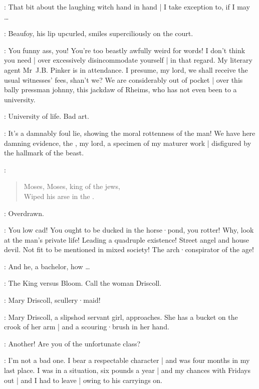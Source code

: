 \Bloom:
That bit about the laughing witch%
hand in hand |
I take exception to,
if I may \ldots

:
Beaufoy,
his lip upcurled,
smiles superciliously on the court.

\Beaufoy:
You funny ass,
you!
You're too beastly awfully weird for words!
I don't think you need |
over excessively disincommodate yourself |
in that regard.
My literary agent Mr~J.B. Pinker is in attendance.
I presume,
my lord,
we shall receive the usual witnesses' fees,
shan't we?
We are considerably out of pocket |
over this bally pressman johnny,
this jackdaw of Rheims,
who has not even been to a university.

\Bloom:
University of life.
Bad art.

\Beaufoy:
It's a damnably foul lie,
showing the moral rottenness of the man!
We have here damning evidence,
the ,
my lord,
a specimen of my maturer work |
disfigured by the hallmark of the beast.

\GalleryVoice:
\begin{verse}
    Moses, Moses, king of the jews,\\
    Wiped his arse in the .
\end{verse}

\Bloom:
Overdrawn.

\Beaufoy:
You low cad!
You ought to be ducked in the horse·pond,
you rotter!
Why,
look at the man's private life!
Leading a quadruple existence!
Street angel and house devil.
Not fit to be mentioned in mixed society!
The arch·conspirator of the age!

\Bloom:
And he,
a bachelor,
how \ldots

\FirstWatch:
The King versus Bloom.
Call the woman Driscoll.

\Crier:
Mary Driscoll,
scullery·maid!

:
Mary Driscoll,
a slipshod servant girl,
approaches.
She has a bucket on the crook of her arm |
and a scouring·brush in her hand.

\SecondWatch:
Another!
Are you of the unfortunate class?

\Driscoll:
I'm not a bad one.
I bear a respectable character |
and was four months in my last place.
I was in a situation,
six pounds a year |
and my chances with Fridays out |
and I had to leave |
owing to his carryings on.

